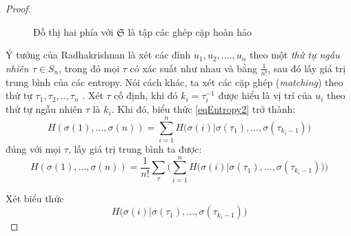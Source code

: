 \documentclass[a4paper, 12pt]{report}
\begin{document}
\begin{proof}
\begin{figure}
\begin{center}
	\caption{Đồ thị hai phía với $\mathfrak{S}$ là tập các ghép cặp hoàn hảo}
	\label{fig:image1}
\end{center}
\end{figure}
Ý tưởng của Radhakrishnan là xét các đỉnh  $u_{1}, u_{2}, ....  , u_{n}$ theo một \textit{thứ tự ngẫu nhiên $\tau \in S_{n}$}, trong đó mọi $\tau$ có xác suất như nhau và bằng $\frac{1}{n!}$, sau đó lấy giá trị trung bình của các entropy. Nói cách khác, ta xét các cặp ghép (\textit{matching}) theo thứ tự $\tau_{1},\tau_{2},..,\tau_{n}$ . Xét $\tau$ cố định, khi đó $k_{i} = \tau ^{-1}_{i}$ được hiểu là vị trí của $u_{i}$ theo thứ tự ngẫu nhiên $\tau$ là $k_{i}$. Khi đó, biểu thức \eqref{eqEntropy2} trở thành:
\begin{equation*}
	H(\sigma(1),...,\sigma(n)) = \displaystyle \sum_{i=1}^{n}H\Big(\sigma (i)| \sigma (\tau_{1}),...,\sigma (\tau_{k_{i}-1})\Big)
\end{equation*}
đúng với mọi $\tau$, lấy giá trị trung bình ta được: 
\begin{equation}
	H(\sigma(1),...,\sigma(n)) = \frac{1}{n!}\displaystyle \sum_{\tau}\Big(\displaystyle \sum_{i=1}^{n}H\Big(\sigma (i)| \sigma (\tau_{1}),...,\sigma (\tau_{k_{i}-1})\Big) \Big) \label{Hentropy}
\end{equation}

Xét biểu thức 
\begin{equation}
H\Big(\sigma (i)| \sigma (\tau_{1}),...,\sigma (\tau_{k_{i}-1})\Big) \label{eqEntropy}
\end{equation}


\end{proof}
\end{document}
